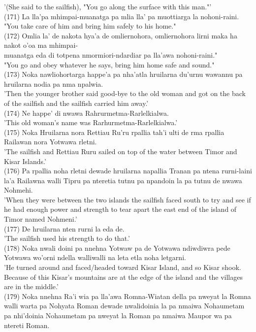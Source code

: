 \documentclass[10pt]{article}
\begin{document}
'(She said to the sailfish), "You go along the surface with this man."'\\
(171) La lla'pa mhimpai-muanatga pa mlia lla' pa muottiarga la nohoni-raini.\\
"You take care of him and bring him safely to his home."\\
(172) Omlia la' de nakota hya'a de omliernohora, omliernohora lirni maka ha nakot o'oa ma mhimpai-\\
muanatga eda di totpena nmormiori-ndardiar pa lla'awa nohoni-raini."\\
"You go and obey whatever he says, bring him home safe and sound."\\
(173) Noka nawliohortarga happe'a pa nha'atla hruilarna du'urnu wawannu pa hruilarna nodia pa nma npalwia.\\
'Then the younger brother said good-bye to the old woman and got on the back of the sailfish and the sailfish carried him away.'\\
(174) Ne happe' di nwawa Rahrurmetma-Rarlelkialwa.\\
'This old woman's name was Rarhurmetma-Rarlelkialwa.'\\
(175) Noka Hruilarna nora Rettiau Ru'ru rpallia tah'i ulti de rma rpallia Railawan nora Yotwawa rletni.\\
'The sailfish and Rettiau Ruru sailed on top of the water between Timor and Kisar Islands.'\\
(176) Pa rpallia noha rletni dewade hruilarna napallia Tranan pa ntena rurni-laini la'a Railawna walli Tipru pa nteretia tutnu pa npandoin la pa tutnu de nwawa Nohmehi.\\
'When they were between the two islands the sailfish faced south to try and see if he had enough power and strength to tear apart the east end of the island of Timor named Nohmeni.'\\
(177) De hruilarna nten rurni la eda de.\\
'The sailfish used his strength to do that.'\\
(178) Noka nwali doini pa nnehna Yotwaw pa de Yotwawa ndiwdiwra pede Yotwawa wo'orni ndella walliwalli na leta etla noha letgarni.\\
'He turned around and faced/headed toward Kisar Island, and so Kisar shook. Because of this Kisar's mountains are at the edge of the island and the villages are in the middle.'\\
(179) Noka nnehna Ra'i wia pa lla'awa Romna-Wiatan della pa nweyat la Romna walli warta pa Nohyata Roman dewade nwalidoinia la pa nmaiwa Nohaumetam pa nhi'doinia Nohaumetam pa nweyat la Roman pa nmaiwa Maupor wa pa ntereti Roman.\\
\end{document}
